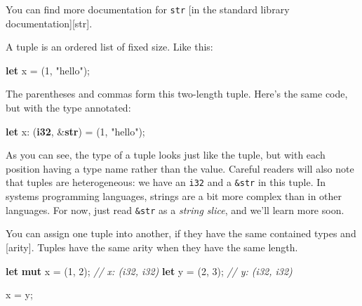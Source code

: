 \documentclass[a4paper,]{book}
\newenvironment{Shaded}{\begin{snugshade}}{\end{snugshade}}
\newcommand{\KeywordTok}[1]{\textcolor[rgb]{0.13,0.29,0.53}{\textbf{{#1}}}}
\newcommand{\DecValTok}[1]{\textcolor[rgb]{0.00,0.00,0.81}{{#1}}}
\newcommand{\StringTok}[1]{\textcolor[rgb]{0.31,0.60,0.02}{{#1}}}
\newcommand{\CommentTok}[1]{\textcolor[rgb]{0.56,0.35,0.01}{\textit{{#1}}}}
\newcommand{\NormalTok}[1]{{#1}}
\begin{document}
You can find more documentation for \texttt{str} {[}in the standard
library documentation{]}{[}str{]}.


A tuple is an ordered list of fixed size. Like this:

\begin{Shaded}
\begin{Highlighting}[]
\KeywordTok{let} \NormalTok{x = (}\DecValTok{1}\NormalTok{, }\StringTok{"hello"}\NormalTok{);}
\end{Highlighting}
\end{Shaded}

The parentheses and commas form this two-length tuple. Here's the same
code, but with the type annotated:

\begin{Shaded}
\begin{Highlighting}[]
\KeywordTok{let} \NormalTok{x: (}\KeywordTok{i32}\NormalTok{, &}\KeywordTok{str}\NormalTok{) = (}\DecValTok{1}\NormalTok{, }\StringTok{"hello"}\NormalTok{);}
\end{Highlighting}
\end{Shaded}

As you can see, the type of a tuple looks just like the tuple, but with
each position having a type name rather than the value. Careful readers
will also note that tuples are heterogeneous: we have an \texttt{i32}
and a \texttt{\&str} in this tuple. In systems programming languages,
strings are a bit more complex than in other languages. For now, just
read \texttt{\&str} as a \emph{string slice}, and we'll learn more soon.

You can assign one tuple into another, if they have the same contained
types and {[}arity{]}. Tuples have the same arity when they have the
same length.

\begin{Shaded}
\begin{Highlighting}[]
\KeywordTok{let} \KeywordTok{mut} \NormalTok{x = (}\DecValTok{1}\NormalTok{, }\DecValTok{2}\NormalTok{); }\CommentTok{// x: (i32, i32)}
\KeywordTok{let} \NormalTok{y = (}\DecValTok{2}\NormalTok{, }\DecValTok{3}\NormalTok{); }\CommentTok{// y: (i32, i32)}

\NormalTok{x = y;}
\end{Highlighting}
\end{Shaded}
\end{document}
